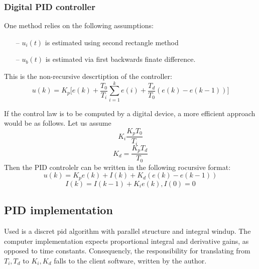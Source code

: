 \subsubsection{Digital PID controller}
One method relies on the following assumptions:
\begin{itemize}
\item[--]{$u_i(t)$ is estimated using second rectangle method}
\item[--]{$u_b(t)$ is estimated via first backwards finate difference.}
\end{itemize}
This is the non-recursive descrtiption of the controller:
\begin{equation}
    u(k) = K_p \Bigg[
    e(k) + \frac{T_0}{T_i} \sum_{i=1}^{k} e(i) + \frac{T_d}{T_0} (e(k)-e(k-1))
    \Bigg]
\end{equation}
\par
If the control law is to be computed by a digital device, a more efficient approach would be as follows.
Let us assume
$$ K_i \frac{K_p T_0}{T_i} $$
$$ K_d = \frac{K_p T_d}{T_0} $$
Then the PID controlelr can be written in the following rocursive format:
\begin{equation}
    u(k) = K_p e(k) + I(k) + K_d (e(k) - e(k-1))
\end{equation}
\begin{equation}
    I(k) = I(k-1) + K_i e(k),
    I(0) = 0
\end{equation}

\subsection{PID implementation}
Used is a discret pid algorithm with parallel structure and integral windup.
The computer implementation expects proportional integral and derivative gains, as opposed to time constants.
Consequencly, the responsibility for translating from $T_i, T_d$ to $K_i, K_d$ falls to the client software, written by the author.

